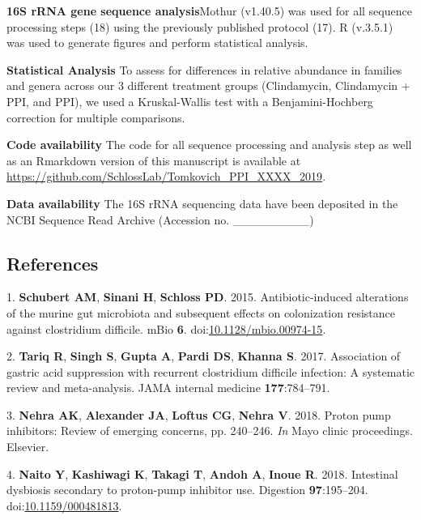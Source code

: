 \documentclass[11pt,]{article}
\begin{document}
\textbf{16S rRNA gene sequence analysis}Mothur (v1.40.5) was used for
all sequence processing steps (18) using the previously published
protocol (17). R (v.3.5.1) was used to generate figures and perform
statistical analysis.

\textbf{Statistical Analysis} To assess for differences in relative
abundance in families and genera across our 3 different treatment groups
(Clindamycin, Clindamycin + PPI, and PPI), we used a Kruskal-Wallis test
with a Benjamini-Hochberg correction for multiple comparisons.

\textbf{Code availability} The code for all sequence processing and
analysis step as well as an Rmarkdown version of this manuscript is
available at
\url{https://github.com/SchlossLab/Tomkovich_PPI_XXXX_2019}.

\textbf{Data availability} The 16S rRNA sequencing data have been
deposited in the NCBI Sequence Read Archive (Accession no.
\_\_\_\_\_\_\_\_\_)

\newpage

\subsection{References}\label{references}

\hypertarget{refs}{}
\hypertarget{ref-Schubert2015}{}
1. \textbf{Schubert AM}, \textbf{Sinani H}, \textbf{Schloss PD}. 2015.
Antibiotic-induced alterations of the murine gut microbiota and
subsequent effects on colonization resistance against clostridium
difficile. mBio \textbf{6}.
doi:\href{https://doi.org/10.1128/mbio.00974-15}{10.1128/mbio.00974-15}.

\hypertarget{ref-tariq2017association}{}
2. \textbf{Tariq R}, \textbf{Singh S}, \textbf{Gupta A}, \textbf{Pardi
DS}, \textbf{Khanna S}. 2017. Association of gastric acid suppression
with recurrent clostridium difficile infection: A systematic review and
meta-analysis. JAMA internal medicine \textbf{177}:784--791.

\hypertarget{ref-nehra2018proton}{}
3. \textbf{Nehra AK}, \textbf{Alexander JA}, \textbf{Loftus CG},
\textbf{Nehra V}. 2018. Proton pump inhibitors: Review of emerging
concerns, pp. 240--246. \emph{In} Mayo clinic proceedings. Elsevier.

\hypertarget{ref-Naito2018}{}
4. \textbf{Naito Y}, \textbf{Kashiwagi K}, \textbf{Takagi T},
\textbf{Andoh A}, \textbf{Inoue R}. 2018. Intestinal dysbiosis secondary
to proton-pump inhibitor use. Digestion \textbf{97}:195--204.
doi:\href{https://doi.org/10.1159/000481813}{10.1159/000481813}.
\end{document}
